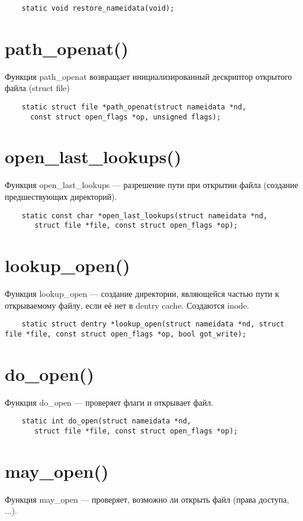 \begin{lstlisting}
	static void restore_nameidata(void);
\end{lstlisting}

\section{path\_openat()}
Функция path\_openat возвращает инициализированный дескриптор открытого файла (struct file)

\begin{lstlisting}
    static struct file *path_openat(struct nameidata *nd,
      const struct open_flags *op, unsigned flags);
\end{lstlisting}

\section{open\_last\_lookups()}
Функция open\_last\_lookups --- разрешение пути при открытии файла (создание предшествующих директорий).

\begin{lstlisting}
    static const char *open_last_lookups(struct nameidata *nd,
       struct file *file, const struct open_flags *op);
\end{lstlisting}

\section{lookup\_open()}
Функция lookup\_open --- создание директории, являющейся частью пути к открываемому файлу, если её нет в dentry cache. Создаются inode.

\begin{lstlisting}
    static struct dentry *lookup_open(struct nameidata *nd, struct file *file, const struct open_flags *op, bool got_write);
\end{lstlisting}

\section{do\_open()}
Функция do\_open --- проверяет флаги и открывает файл.

\begin{lstlisting}
    static int do_open(struct nameidata *nd,
       struct file *file, const struct open_flags *op);
\end{lstlisting}

\section{may\_open()}
Функция may\_open --- проверяет, возможно ли открыть файл (права доступа, ...).

